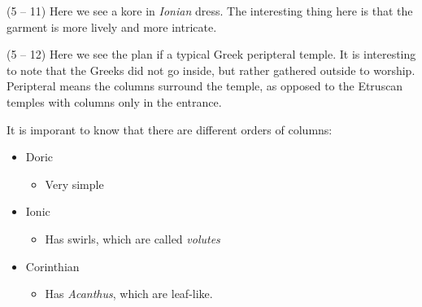 \documentclass{article}
\begin{document}
\begin{spacing}{1.2}
    (5 -- 11) Here we see a kore in \emph{Ionian} dress. The interesting thing here is that the garment is more lively and more intricate.

    (5 -- 12) Here we see the plan if a typical Greek peripteral temple. It is interesting to note that the Greeks did not go inside, but rather gathered outside to worship. Peripteral means the columns surround the temple, as opposed to the Etruscan temples with columns only in the entrance.

    It is imporant to know that there are different orders of columns:
    \begin{itemize}
        \item Doric
        \begin{itemize}
            \item Very simple
        \end{itemize}
        \item Ionic
        \begin{itemize}
            \item Has swirls, which are called \emph{volutes} 
        \end{itemize}
        \item Corinthian
        \begin{itemize}
            \item Has \emph{Acanthus}, which are leaf-like.
        \end{itemize}
    \end{itemize}

    \end{spacing}
\end{document}
